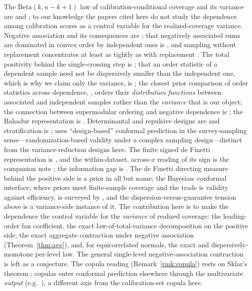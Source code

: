 \documentclass[11pt]{article}
\begin{document}
The $\mathrm{Beta}(k,n-k+1)$ law of calibration-conditional coverage and its variance are
\citet{vovk2012} and \citet{marques2024}; to our knowledge the papers cited here do not study the
dependence among calibration scores as a control variable for the realized-coverage variance. Negative association and its consequences are \citet{joagdev1983}; that negatively associated
sums are dominated in convex order by independent ones is \citet{shao2000}, and sampling without
replacement concentrates at least as tightly as with replacement \citep{serfling1974}. The total
positivity behind the single-crossing step is \citet{karlin1968}; that an order statistic of a
dependent sample need not be dispersively smaller than the independent one, which is why we claim
only the variance, is \citet{panja2022}; the closest prior comparison of order statistics across
dependence, \citet{huhu1998}, orders their \emph{distribution functions} between associated and
independent samples rather than the \emph{variance} that is our object; the connection between
supermodular ordering and negative dependence is \citet{christofides2004}; the Bahadur representation
is \citet{bahadur1966}. Determinantal and repulsive designs are \citet{hough2006,bardenet2016} and
stratification is \citet{cochran1977}; \citet{wieczorek2023} uses ``design-based'' conformal
prediction in the survey-sampling sense---randomization-based validity under a complex sampling
design---distinct from the variance-reduction designs here. The finite signed de Finetti representation is
\citet{kerns2006}, and the within-dataset, across-$x$ reading of its sign is the companion note
\citep{cotton_signed}; the information gap is \citep{cotton_marginally}. The de Finetti directing
measure behind the positive side is a prior in all but name; the Bayesian--conformal interface, where
priors meet finite-sample coverage and the trade is validity against efficiency, is surveyed by
\citet{deliu2025}, and the dispersion-versus-guarantee tension above is a variance-side instance of it.
The contribution here is to
make the dependence the control variable for the \emph{variance} of realized coverage: the
leading-order fan coefficient, the exact law-of-total-variance decomposition on the positive side, the
exact aggregate contraction under negative association (Theorem~\ref{thm:agg}), and, for equicorrelated
normals, the exact and dispersively-monotone per-level law. The general single-level negative-association
contraction is left as a conjecture. The copula reading (Remark~\ref{rmk:copula}) rests on Sklar's
theorem \citep{sklar1959,nelsen2006}; copulas enter conformal prediction elsewhere through the
multivariate \emph{output} (e.g.\ \citealp{sunyu2024}), a different axis from the calibration-set
copula here.
\end{document}
